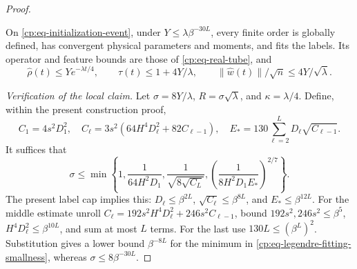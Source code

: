 \begin{proof}
\begin{claim}
\label{cp:legendre-fit}
On \eqref{cp:eq-initialization-event}, under
$Y\le\lambda\beta^{-30L}$, every finite order is globally defined,
has convergent physical parameters and moments, and fits the labels.
Its operator and feature bounds are those of
\eqref{cp:eq-real-tube}, and
\begin{equation}
 \widehat\rho(t)\le Ye^{-\lambda t/4},\qquad
 \tau(t)\le1+4Y/\lambda,\qquad
 \|\widehat w(t)\|/\sqrt n\le4Y/\sqrt\lambda.
 \label{cp:eq-legendre-physical}
\end{equation}
\end{claim}
\emph{Verification of the local claim.}
Let $\sigma=8Y/\lambda$, $R=\sigma\sqrt\lambda$, and
$\kappa=\lambda/4$. Define, within the present construction proof,
\[
 C_1=4s^2D_1^2,\quad
 C_\ell=3s^2(64H^4D_\ell^2+82C_{\ell-1}),\quad
 E_*=130\sum_{\ell=2}^LD_\ell\sqrt{C_{\ell-1}}.
\]
It suffices that
\begin{equation}
 \sigma\le\min\left\{1,\frac1{64H^2D_1},
 \frac1{\sqrt{8\sqrt{C_L}}},
 \left(\frac1{8H^2D_1E_*}\right)^{2/7}\right\}.
 \label{cp:eq-legendre-fitting-smallness}
\end{equation}
The present label cap implies this: $D_\ell\le\beta^{2L}$,
$\sqrt{C_\ell}\le\beta^{8L}$, and $E_*\le\beta^{12L}$.
For the middle estimate unroll
$C_\ell=192s^2H^4D_\ell^2+246s^2C_{\ell-1}$, bound
$192s^2,246s^2\le\beta^5$, $H^4D_\ell^2\le\beta^{10L}$,
and sum at most $L$ terms.  For the last use
$130L\le(\beta^L)^2$.  Substitution gives a lower bound
$\beta^{-8L}$ for the minimum in
\eqref{cp:eq-legendre-fitting-smallness}, whereas
$\sigma\le8\beta^{-30L}$.


\end{proof}
